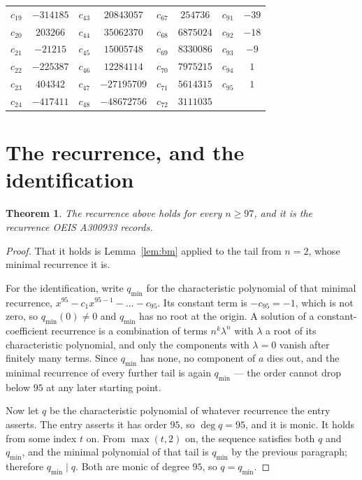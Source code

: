 \documentclass[11pt,a4paper]{article}
\theoremstyle{plain}
\newtheorem{theorem}{Theorem}
\theoremstyle{definition}
\begin{document}
\begin{center}
\begin{tabular}{cccccccc}
$c_{19}$ & $-314185$ & $c_{43}$ & $20843057$ & $c_{67}$ & $254736$ & $c_{91}$ & $-39$ \\
$c_{20}$ & $203266$ & $c_{44}$ & $35062370$ & $c_{68}$ & $6875024$ & $c_{92}$ & $-18$ \\
$c_{21}$ & $-21215$ & $c_{45}$ & $15005748$ & $c_{69}$ & $8330086$ & $c_{93}$ & $-9$ \\
$c_{22}$ & $-225387$ & $c_{46}$ & $12284114$ & $c_{70}$ & $7975215$ & $c_{94}$ & $1$ \\
$c_{23}$ & $404342$ & $c_{47}$ & $-27195709$ & $c_{71}$ & $5614315$ & $c_{95}$ & $1$ \\
$c_{24}$ & $-417411$ & $c_{48}$ & $-48672756$ & $c_{72}$ & $3111035$ &  &  \\
\end{tabular}
\end{center}

\section{The recurrence, and the identification}

\begin{theorem}
The recurrence above holds for every $n\ge97$, and it is the recurrence OEIS A300933 records.
\end{theorem}

\begin{proof}
That it holds is Lemma~\ref{lem:bm} applied to the tail from $n=2$, whose minimal
recurrence it is.

For the identification, write $q_{\min}$ for the characteristic polynomial of that minimal
recurrence, $x^{95}-c_1x^{95-1}-\dots-c_{95}$. Its constant term is
$-c_{95}=-1$, which is not zero, so $q_{\min}(0)\neq0$ and $q_{\min}$ has no
root at the origin. A solution of a constant-coefficient recurrence is a combination of terms
$n^{k}\lambda^{n}$ with $\lambda$ a root of its characteristic polynomial, and only the
components with $\lambda=0$ vanish after finitely many terms. Since $q_{\min}$ has none, no
component of $a$ dies out, and the minimal recurrence of every further tail is again
$q_{\min}$ --- the order cannot drop below $95$ at any later starting point.

Now let $q$ be the characteristic polynomial of whatever recurrence the entry asserts. The
entry asserts it has order $95$, so $\deg q=95$, and it is monic. It holds from some
index $t$ on. From $\max(t,2)$ on, the sequence satisfies both $q$ and $q_{\min}$, and
the minimal polynomial of that tail is $q_{\min}$ by the previous paragraph; therefore
$q_{\min}\mid q$. Both are monic of degree $95$, so $q=q_{\min}$.
\end{proof}
\end{document}

